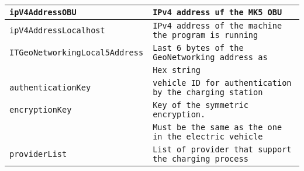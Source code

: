 \begin{tabular}{|l|l|}
	\hline 
	\texttt{ipV4AddressOBU} & \texttt{IPv4 address uf the MK5 OBU} \\
	\hline  
	\texttt{ipV4AddressLocalhost} & \texttt{IPv4 address of the machine the program is running} \\ 
	\hline 
	\texttt{ITGeoNetworkingLocal5Address} & \texttt{Last 6 bytes of the GeoNetworking address as} \\
	&	\texttt{Hex string} \\ 
	\hline 
	\texttt{authenticationKey} & \texttt{vehicle ID for authentication by the charging station} \\
	\hline
	\texttt{encryptionKey}  & \texttt{Key of the symmetric encryption.} \\ 
	& \texttt{Must be the same as the one in the electric vehicle} \\ 
	\hline 
	\texttt{providerList} & \texttt{List of provider that support the charging process} \\ 
	\hline 
\end{tabular}

\clearpage
\pagebreak